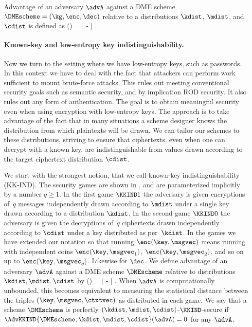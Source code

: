 Advantage of an adversary $\advA$ against a DME scheme $\DMEscheme = (\kg,\enc,\dec)$
relative to a distributions $\kdist$, $\mdist$, and $\cdist$ is 
defined as
\bnm
  \AdvleROD{\DMEscheme,\cdist}(\advA) = 
          \left|
              - \right| \;.
\enm


\paragraph{Known-key and low-entropy key indistinguishability.}
Now we turn to the setting where we have low-entropy keys, such as passwords. In
this context we have to deal with the fact that attackers can perform work
sufficient to mount brute-force attacks. This rules out meeting conventional security 
goals such as semantic security, and by implication ROD security. It also rules
out any form of authentication.
The goal is to obtain meaningful security even when using encryption with
low-entropy keys. The approach is to take
advantage of the fact that in many situations a scheme designer knows the 
distribution from which plaintexts will be drawn. We can tailor our schemes to
these distributions, striving to ensure that ciphertexts, even when one can
decrypt with a known key, are indistinguishable from values drawn according
to the target ciphertext distribution $\cdist$. 

We start with the strongest notion, that we call known-key indistinguishability
(KK-IND). The security games are shown in , and are
parameterized implicitly by a number $q\ge 1$. In the first game $\KKIND1$ the
adversary is given encryptions of~$q$ messages independently drawn according to
$\mdist$ under a single key drawn according to a distribution $\kdist$. In the
second game $\KKIND0$ the adversary is given the decryptions of~$q$ ciphertexts
drawn independently according to $\cdist$ under a key distributed 
as per~$\kdist$.  In the games we have extended our notation so that running
$\enc(\key,\msgvec)$ means running with independent coins
$\enc(\key,\msgvec_1)$, $\enc(\key,\msgvec_2)$, and so on up to
$\enc(\key,\msgvec_q)$. Likewise for $\dec$. 
We define advantage of an adversary $\advA$ against a DME scheme $\DMEscheme$
relative to distributions $\kdist,\mdist,\cdist$ by
\bnm
  \AdvKKIND{\DMEscheme,\kdist,\mdist,\cdist}(\advA) 
    = \left| 
          -  \right| \;.
\enm
When $\advA$ is computationally unbounded, this becomes equivalent to measuring
the statistical distance between the triples $(\key,\msgvec,\ctxtvec)$
as distributed in each game. We say that a scheme $\DMEscheme$ is perfectly 
$(\kdist,\mdist,\cdist)$-$\KKIND$-secure if
$\AdvKKIND{\DMEscheme,\kdist,\mdist,\cdist}(\advA) = 0$ for any $\advA$.

